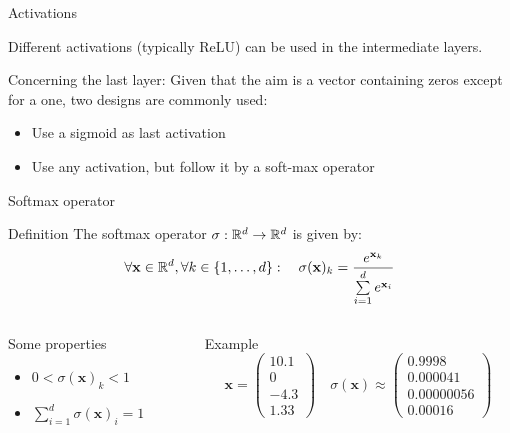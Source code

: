\documentclass[xcolor=pdftex,dvipsnames,table,mathserif]{beamer}
\newcommand{\myvec}[1]{\ensuremath{\begin{pmatrix}#1\end{pmatrix}}}
\begin{document}
\begin{frame}{Activations}

  Different activations (typically ReLU) can be used in the intermediate layers.
  \vspace{1em}

  Concerning the last layer: Given that the aim is a vector containing zeros except for a one, two designs are commonly used:

  \begin{itemize}
  \item Use a sigmoid as last activation
  \item Use any activation, but follow it by a soft-max operator
  \end{itemize}

\end{frame}

\begin{frame}{Softmax operator}

  \begin{block}{Definition}
    The softmax operator $\sigma: \mathbb{R}^d \rightarrow \mathbb{R}^d$ is given by:
    \[
    \forall \mathbf{x}  \in \mathbb{R}^d, \forall k \in \{1, \ldots, d\}:\quad \sigma(\mathbf{x})_k = \frac{e^{\mathbf{x}_k}}{\sum\limits_{i=1}^d e^{\mathbf{x}_i}}
    \]
  \end{block}

  \pause

  \begin{columns}
    \begin{column}{.3\textwidth}
      \begin{block}{Some properties}
        \begin{itemize}
        \item $0 < \sigma(\mathbf{x})_k < 1$
        \item $\sum\limits_{i=1}^d \sigma(\mathbf{x})_i = 1$
        \end{itemize}
      \end{block}

    \end{column}

    \pause

    \begin{column}{.7\textwidth}

      \begin{block}{Example}
        \[
        \mathbf{x} = \myvec{10.1\\0\\-4.3\\1.33}  \quad \sigma(\mathbf{x}) \approx \myvec{0.9998\\0.000041\\0.00000056\\0.00016}
        \]

      \end{block}



    \end{column}
  \end{columns}



\end{frame}
\end{document}
